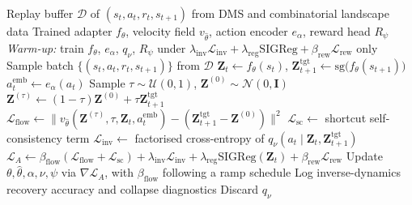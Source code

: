\documentclass[12pt, a4paper]{article}
\begin{document}
\begin{algorithm}[H]
\caption{ProteinDreamer -- World Model Training (Architecture A)}
\label{alg:world_model}
\begin{algorithmic}[1]
\REQUIRE Replay buffer $\mathcal{D}$ of $(s_t, a_t, r_t, s_{t+1})$ from DMS and combinatorial landscape data
\ENSURE Trained adapter $f_\theta$, velocity field $v_{\hat{\theta}}$, action encoder $e_\alpha$, reward head $R_\psi$
\STATE \textit{Warm-up:} train $f_\theta$, $e_\alpha$, $q_\nu$, $R_\psi$ under $\lambda_\text{inv}\mathcal{L}_\text{inv} + \lambda_\text{reg}\mathrm{SIGReg} + \beta_\text{rew}\mathcal{L}_\text{rew}$ only
\REPEAT
    \STATE Sample batch $\{(s_t, a_t, r_t, s_{t+1})\}$ from $\mathcal{D}$
    \STATE $\mathbf{Z}_t \leftarrow f_\theta(s_t)$, \quad $\mathbf{Z}_{t+1}^\text{tgt} \leftarrow \mathrm{sg}\big(f_\theta(s_{t+1})\big)$ 
    \STATE $a_t^\text{emb} \leftarrow e_\alpha(a_t)$
    \STATE Sample $\tau \sim \mathcal{U}(0,1)$, \quad $\mathbf{Z}^{(0)} \sim \mathcal{N}(0, \mathbf{I})$
    \STATE $\mathbf{Z}^{(\tau)} \leftarrow (1-\tau)\mathbf{Z}^{(0)} + \tau \mathbf{Z}_{t+1}^\text{tgt}$
    \STATE $\mathcal{L}_\text{flow} \leftarrow \lVert v_{\hat{\theta}}(\mathbf{Z}^{(\tau)}, \tau, \mathbf{Z}_t, a_t^\text{emb}) - (\mathbf{Z}_{t+1}^\text{tgt} - \mathbf{Z}^{(0)}) \rVert^2$
    \STATE $\mathcal{L}_\text{sc} \leftarrow$ shortcut self-consistency term 
    \STATE $\mathcal{L}_\text{inv} \leftarrow$ factorised cross-entropy of $q_\nu(a_t \mid \mathbf{Z}_t, \mathbf{Z}_{t+1}^\text{tgt})$
    \STATE $\mathcal{L}_A \leftarrow \beta_\text{flow}(\mathcal{L}_\text{flow} + \mathcal{L}_\text{sc}) + \lambda_\text{inv}\mathcal{L}_\text{inv} + \lambda_\text{reg}\mathrm{SIGReg}(\mathbf{Z}_t) + \beta_\text{rew}\mathcal{L}_\text{rew}$
    \STATE Update $\theta, \hat{\theta}, \alpha, \nu, \psi$ via $\nabla \mathcal{L}_A$, with $\beta_\text{flow}$ following a ramp schedule
    \STATE Log inverse-dynamics recovery accuracy and collapse diagnostics
\STATE Discard $q_\nu$
\end{algorithmic}
\end{algorithm}
\end{document}
